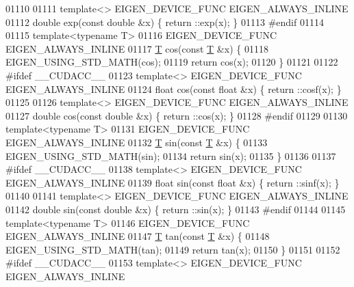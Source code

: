 \begin{DoxyCode}
01110 
01111 \textcolor{keyword}{template}<> EIGEN\_DEVICE\_FUNC EIGEN\_ALWAYS\_INLINE
01112 \textcolor{keywordtype}{double} exp(\textcolor{keyword}{const} \textcolor{keywordtype}{double} &x) \{ return ::exp(x); \}
01113 \textcolor{preprocessor}{#endif}
01114 
01115 \textcolor{keyword}{template}<\textcolor{keyword}{typename} T>
01116 EIGEN\_DEVICE\_FUNC EIGEN\_ALWAYS\_INLINE
01117 \hyperlink{group___sparse_core___module_class_eigen_1_1_triplet}{T} cos(\textcolor{keyword}{const} \hyperlink{group___sparse_core___module_class_eigen_1_1_triplet}{T} &x) \{
01118   EIGEN\_USING\_STD\_MATH(cos);
01119   \textcolor{keywordflow}{return} cos(x);
01120 \}
01121 
01122 \textcolor{preprocessor}{#ifdef \_\_CUDACC\_\_}
01123 \textcolor{keyword}{template}<> EIGEN\_DEVICE\_FUNC EIGEN\_ALWAYS\_INLINE
01124 \textcolor{keywordtype}{float} cos(\textcolor{keyword}{const} \textcolor{keywordtype}{float} &x) \{ return ::cosf(x); \}
01125 
01126 \textcolor{keyword}{template}<> EIGEN\_DEVICE\_FUNC EIGEN\_ALWAYS\_INLINE
01127 \textcolor{keywordtype}{double} cos(\textcolor{keyword}{const} \textcolor{keywordtype}{double} &x) \{ return ::cos(x); \}
01128 \textcolor{preprocessor}{#endif}
01129 
01130 \textcolor{keyword}{template}<\textcolor{keyword}{typename} T>
01131 EIGEN\_DEVICE\_FUNC EIGEN\_ALWAYS\_INLINE
01132 \hyperlink{group___sparse_core___module_class_eigen_1_1_triplet}{T} sin(\textcolor{keyword}{const} \hyperlink{group___sparse_core___module_class_eigen_1_1_triplet}{T} &x) \{
01133   EIGEN\_USING\_STD\_MATH(sin);
01134   \textcolor{keywordflow}{return} sin(x);
01135 \}
01136 
01137 \textcolor{preprocessor}{#ifdef \_\_CUDACC\_\_}
01138 \textcolor{keyword}{template}<> EIGEN\_DEVICE\_FUNC EIGEN\_ALWAYS\_INLINE
01139 \textcolor{keywordtype}{float} sin(\textcolor{keyword}{const} \textcolor{keywordtype}{float} &x) \{ return ::sinf(x); \}
01140 
01141 \textcolor{keyword}{template}<> EIGEN\_DEVICE\_FUNC EIGEN\_ALWAYS\_INLINE
01142 \textcolor{keywordtype}{double} sin(\textcolor{keyword}{const} \textcolor{keywordtype}{double} &x) \{ return ::sin(x); \}
01143 \textcolor{preprocessor}{#endif}
01144 
01145 \textcolor{keyword}{template}<\textcolor{keyword}{typename} T>
01146 EIGEN\_DEVICE\_FUNC EIGEN\_ALWAYS\_INLINE
01147 \hyperlink{group___sparse_core___module_class_eigen_1_1_triplet}{T} tan(\textcolor{keyword}{const} \hyperlink{group___sparse_core___module_class_eigen_1_1_triplet}{T} &x) \{
01148   EIGEN\_USING\_STD\_MATH(tan);
01149   \textcolor{keywordflow}{return} tan(x);
01150 \}
01151 
01152 \textcolor{preprocessor}{#ifdef \_\_CUDACC\_\_}
01153 \textcolor{keyword}{template}<> EIGEN\_DEVICE\_FUNC EIGEN\_ALWAYS\_INLINE

\end{DoxyCode}
